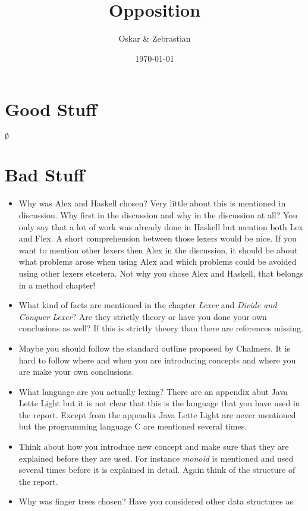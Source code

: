 \documentclass{article}
\title{Opposition}
\author{Oskar \& Zebrastian}
\begin{document}
\date{\today}
\maketitle

\section*{Good Stuff}
$\emptyset$
\section*{Bad Stuff}
\begin{itemize}
\item Why was Alex and Haskell chosen? Very little about this is mentioned in
discussion. Why first in the discussion and why in the discussion at all? You
only say that a lot of work was already done in Haskell but mention both Lex and
Flex. A short comprehension between those lexers would be nice. If you want to
mention other lexers then Alex in the discussion, it should be about
what problems arose when using Alex and which problems could be avoided using
other lexers etcetera.
Not why you chose Alex and Haskell, that belongs in a method chapter!
\item What kind of facts are mentioned in the chapter \emph{Lexer} and
\emph{Divide and Conquer Lexer}? Are they strictly theory or have you done
your own conclusions as well? If this is strictly theory than there are
references missing.
\item Maybe you should follow the standard outline proposed by
Chalmers. It is hard to follow where and when you are introducing concepts and
where you are make your own conclusions.
\item What language are you actually lexing? There are an appendix abut Java
Lette Light but it is not clear that this is the language that you have used in
the report. Except from the appendix Java Lette Light are never mentioned but
the programming language C are mentioned several times.
\item Think about how you introduce new concept and make sure that they are
explained before they are used. For instance
\emph{monoid} is mentioned and used several times before it is explained in
detail. Again think of the structure of the report.
\item Why was finger trees chosen? Have you considered other data structures as
\end{itemize}
\end{document}
